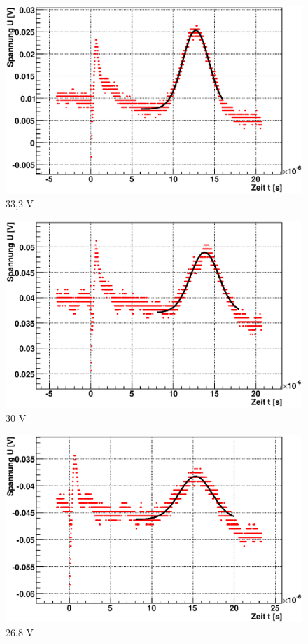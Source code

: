 \documentclass[12pt]{article}
\begin{document}
\begin{figure}[H]  
\begin{minipage}{0.33\linewidth}
\centering
\includegraphics[width=0.9\linewidth]{pictures/varVolt/06.eps}
\small{33,2 V}
\end{minipage}
\begin{minipage}{0.33\linewidth}
\centering
\includegraphics[width=0.9\linewidth]{pictures/varVolt/07.eps}
\small{30 V}
\end{minipage}
\begin{minipage}{0.33\linewidth}
\centering 
\includegraphics[width=0.9\linewidth]{pictures/varVolt/08.eps}
\small{26,8 V}
\end{minipage}
\end{figure}
\end{document}
